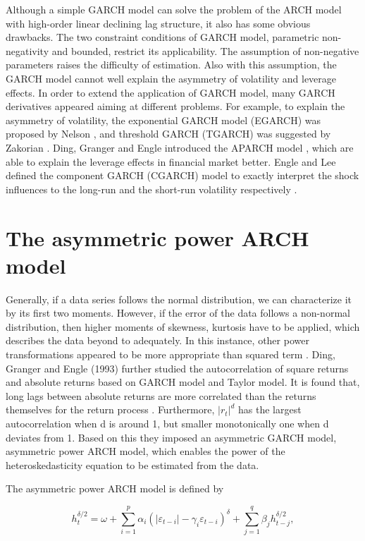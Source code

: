 Although a simple GARCH model can solve the problem of the ARCH model with high-order linear declining lag structure, it also has some obvious drawbacks.  The two constraint conditions of GARCH model, parametric non-negativity and bounded, restrict its applicability. The assumption of non-negative parameters raises the difficulty of estimation. Also with this assumption, the GARCH model cannot well explain the asymmetry of volatility and leverage effects. In order to extend the application of GARCH model, many GARCH derivatives appeared aiming at different problems. For example, to explain the asymmetry of volatility, the exponential GARCH model (EGARCH) was proposed by Nelson \citep{Nelson1991}, and threshold GARCH (TGARCH) was suggested by Zakorian \citep{Zakoian1994}. Ding, Granger and Engle introduced the APARCH model \citep{Ding1993}, which are able to explain the leverage effects in financial market better. Engle and Lee defined the component GARCH (CGARCH) model to exactly interpret the shock influences to the long-run and the short-run volatility respectively \citep{0-19-829683-5}.

\section{The asymmetric power ARCH model}

Generally, if a data series follows the normal distribution, we can characterize it by its first two moments. However, if the error of the data follows a non-normal distribution, then higher moments of skewness, kurtosis have to be applied, which describes the data beyond to adequately. In this instance, other power transformations appeared to be more appropriate than squared term \citep{McKenzie1999}. Ding, Granger and Engle (1993) further studied the autocorrelation of square returns and absolute returns based on GARCH model and Taylor model. It is found that, long lags between absolute returns are more correlated than the returns themselves for the return process \citep{stephen1986modelling}. Furthermore, $|r_{t}|^{d}$ has the largest autocorrelation when d is around 1, but smaller monotonically one when d deviates from 1. Based on this they imposed an asymmetric GARCH model, asymmetric power ARCH model, which enables the power of the heteroskedasticity equation to be estimated from the data.


The asymmetric power ARCH model is defined by

\begin{equation}
h_{t}^{\delta/2} = \omega + \sum_{i=1}^{p} \alpha_{i}(|\varepsilon_{t-i}|-\gamma_{i}\varepsilon_{t-i})^{\delta} + \sum_{j=1}^{q}\beta_{j}h_{t-j}^{\delta/2},
\end{equation}


